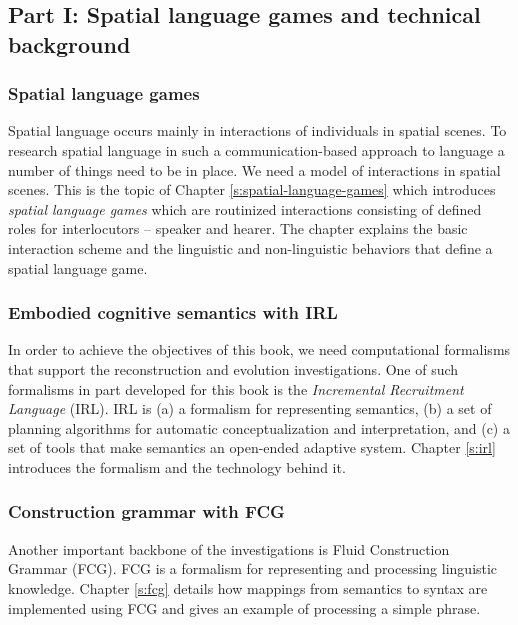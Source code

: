 \subsection{Part I: Spatial language games and technical background}
\subsubsection{Spatial language games}
Spatial language occurs mainly in interactions of individuals in spatial scenes.
To research spatial language in such a communication-based approach
to language a number of things need to be in place. We need a model of 
interactions in spatial scenes. This is the topic of Chapter \ref{s:spatial-language-games} which 
introduces \emph{spatial language games} which are routinized interactions
consisting of defined roles for interlocutors -- speaker and hearer. 
The chapter explains the basic interaction scheme and the 
linguistic and non-linguistic behaviors that define a spatial language
game. 

\subsubsection{Embodied cognitive semantics with IRL}
In order to achieve the objectives of this book, we need computational 
formalisms that support the reconstruction and evolution investigations. 
One of such formalisms in part developed for this book is the
\emph{Incremental Recruitment Language} (IRL). IRL is (a) a formalism
for representing semantics, (b) a set of planning algorithms for automatic
conceptualization and interpretation, and (c) a set of tools that make
semantics an open-ended adaptive system. Chapter \ref{s:irl} 
introduces the formalism and the technology behind it.

\subsubsection{Construction grammar with FCG}
Another important backbone of the investigations is Fluid Construction 
Grammar (FCG). FCG is a formalism for representing and processing linguistic 
knowledge. Chapter \ref{s:fcg} details how mappings from semantics to syntax 
are implemented using FCG and gives an example of processing a simple phrase.

